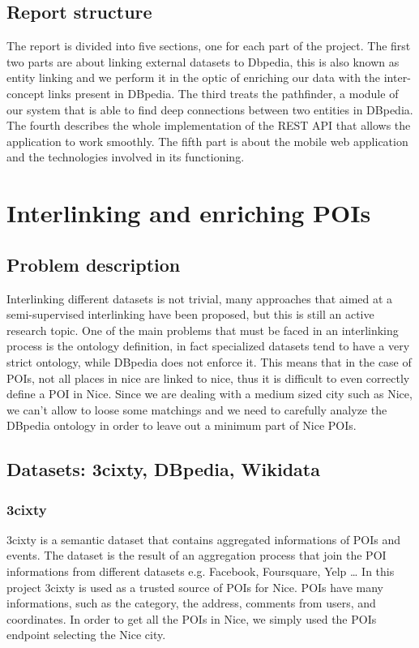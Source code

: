 \documentclass[paper=a4, fontsize=11pt]{scrartcl}
\begin{document}
\subsection{Report structure}
The report is divided into five sections, one for each part of the project. The first two parts are about linking external datasets to Dbpedia, this is also known as entity linking and we perform it in the optic of enriching our data with the inter-concept links present in DBpedia.
The third treats the pathfinder, a module of our system that is able to find deep connections between two entities in DBpedia.
The fourth describes the whole implementation of the REST API that allows the application to work smoothly.
The fifth part is about the mobile web application and the technologies involved in its functioning.

\section{Interlinking and enriching POIs}
\subsection{Problem description}
Interlinking different datasets is not trivial, many approaches that aimed at a semi-supervised interlinking have been proposed, but this is still an active research topic.
One of the main problems that must be faced in an interlinking process is the ontology definition, in fact specialized datasets tend to have a very strict ontology, while DBpedia does not enforce it. This means that in the case of POIs, not all places in nice are linked to nice, thus it is difficult to even correctly define a POI in Nice.
Since we are dealing with a medium sized city such as Nice, we can't allow to loose some matchings and we need to carefully analyze the DBpedia ontology in order to leave out a minimum part of Nice POIs.

\subsection{Datasets: 3cixty, DBpedia, Wikidata}
\subsubsection{3cixty}
3cixty is a semantic dataset that contains aggregated informations of POIs and events. The dataset is the result of an aggregation process that join the POI informations from different datasets e.g. Facebook, Foursquare, Yelp \dots
In this project 3cixty is used as a trusted source of POIs for Nice.
POIs have many informations, such as the category, the address, comments from users, and coordinates. In order to get all the POIs in Nice, we simply used the POIs endpoint selecting the Nice city.
\end{document}
